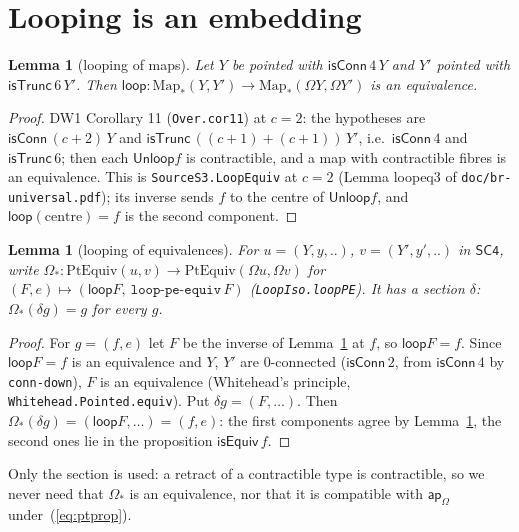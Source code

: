 \documentclass[11pt]{amsart}
\newtheorem{lemma}[theorem]{Lemma}
\theoremstyle{definition}
\theoremstyle{remark}
\newcommand{\Om}{\Omega}
\newcommand{\code}[1]{\texttt{#1}}
\newcommand{\cT}{\mathsf{isTrunc}}
\newcommand{\cC}{\mathsf{isConn}}
\newcommand{\ap}{\mathsf{ap}}
\newcommand{\SCf}{\mathsf{SC4}}
\newcommand{\Unloop}{\mathsf{Unloop}}
\newcommand{\Map}{\mathrm{Map}_*}
\newcommand{\PtEq}{\mathrm{PtEquiv}}
\newcommand{\lp}{\mathsf{loop}}
\begin{document}
\section{Looping is an embedding}

\begin{lemma}[looping of maps]\label{lem:loopmaps}
Let $Y$ be pointed with $\cC\,4\,Y$ and $Y'$ pointed with $\cT\,6\,Y'$. Then
$\lp:\Map(Y,Y')\to\Map(\Om Y,\Om Y')$ is an equivalence.
\end{lemma}
\begin{proof}
DW1 Corollary 11 (\code{Over.cor11}) at $c=2$: the hypotheses are
$\cC\,(c+2)\,Y$ and $\cT\,((c+1)+(c+1))\,Y'$, i.e.\ $\cC\,4$ and $\cT\,6$;
then each $\Unloop f$ is contractible, and a map with contractible fibres is
an equivalence. This is \code{SourceS3.LoopEquiv} at $c=2$ (Lemma loopeq3 of
\code{doc/br-universal.pdf}); its inverse sends $f$ to the centre of
$\Unloop f$, and $\lp(\text{centre})=f$ is the second component.
\end{proof}

\begin{lemma}[looping of equivalences]\label{lem:loopeq}
For $u=(Y,y,..)$, $v=(Y',y',..)$ in $\SCf$, write $\Om_*:\PtEq(u,v)\to
\PtEq(\Om u,\Om v)$ for $(F,e)\mapsto(\lp F,\ \code{loop-pe-equiv}\,F)$
(\code{LoopIso.loopPE}). It has a section $\delta$:
$\Om_*(\delta g)=g$ for every $g$.
\end{lemma}
\begin{proof}
For $g=(f,e)$ let $F$ be the inverse of Lemma~\ref{lem:loopmaps} at $f$, so
$\lp F=f$. Since $\lp F=f$ is an equivalence and $Y$, $Y'$ are $0$-connected
($\cC\,2$, from $\cC\,4$ by \code{conn-down}), $F$ is an equivalence
(Whitehead's principle, \code{Whitehead.Pointed.equiv}). Put
$\delta g=(F,\ldots)$. Then $\Om_*(\delta g)=(\lp F,\ldots)=(f,e)$: the first
components agree by Lemma~\ref{lem:loopmaps}, the second ones lie in the
proposition $\mathsf{isEquiv}\,f$.
\end{proof}

\noindent Only the section is used: a retract of a contractible type is
contractible, so we never need that $\Om_*$ is an equivalence, nor that it is
compatible with $\ap_\Om$ under~(\ref{eq:ptprop}).
\end{document}
